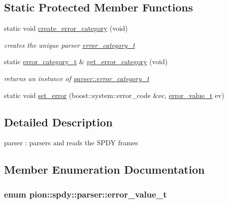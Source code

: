 \subsection*{Static Protected Member Functions}
\begin{DoxyCompactItemize}
\item 
static void \hyperlink{classpion_1_1spdy_1_1parser_a81f25358fc4fbffeb6532cf10c6f7aa4}{create\-\_\-error\-\_\-category} (void)
\begin{DoxyCompactList}\small\item\em creates the unique parser \hyperlink{classpion_1_1spdy_1_1parser_1_1error__category__t}{error\-\_\-category\-\_\-t} \end{DoxyCompactList}\item 
static \hyperlink{classpion_1_1spdy_1_1parser_1_1error__category__t}{error\-\_\-category\-\_\-t} \& \hyperlink{classpion_1_1spdy_1_1parser_aba54c4e506d27521190271a35f020257}{get\-\_\-error\-\_\-category} (void)
\begin{DoxyCompactList}\small\item\em returns an instance of \hyperlink{classpion_1_1spdy_1_1parser_1_1error__category__t}{parser\-::error\-\_\-category\-\_\-t} \end{DoxyCompactList}\item 
static void \hyperlink{classpion_1_1spdy_1_1parser_a8caaf3917f65aeab5feee513e8b656b5}{set\-\_\-error} (boost\-::system\-::error\-\_\-code \&ec, \hyperlink{classpion_1_1spdy_1_1parser_abaab54ece6835d5763900809a1d6915b}{error\-\_\-value\-\_\-t} ev)
\end{DoxyCompactItemize}


\subsection{Detailed Description}
parser \-: parsers and reads the S\-P\-D\-Y frames 

\subsection{Member Enumeration Documentation}
\hypertarget{classpion_1_1spdy_1_1parser_abaab54ece6835d5763900809a1d6915b}{
\subsubsection[{error\-\_\-value\-\_\-t}]{\setlength{\rightskip}{0pt plus 5cm}enum {\bf pion\-::spdy\-::parser\-::error\-\_\-value\-\_\-t}}}\label{classpion_1_1spdy_1_1parser_abaab54ece6835d5763900809a1d6915b}



